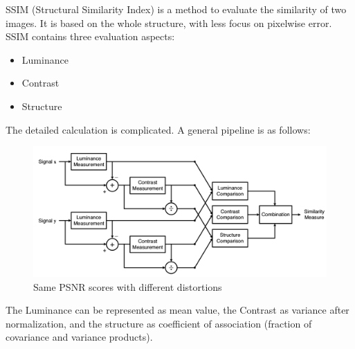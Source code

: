 \documentclass{article}
\begin{document}
\begin{itemize}
      SSIM (Structural Similarity Index) is a method to evaluate the similarity of two images.
      It is based on the whole structure, with less focus on pixelwise error. 
      SSIM contains three evaluation aspects:
      \begin{itemize}
          \item Luminance
          \item Contrast
          \item Structure
      \end{itemize}
      The detailed calculation is complicated. A general pipeline is as follows:
      \begin{figure}[H]
          \centering
          \includegraphics[scale = 0.2]{images/SSIM.png}
          \caption{Same PSNR scores with different distortions}
      \end{figure}
      The Luminance can be represented as mean value, the Contrast as variance after normalization, 
      and the structure as coefficient of association (fraction of covariance and variance products).
  
  \end{itemize}
  
  
\end{document}
